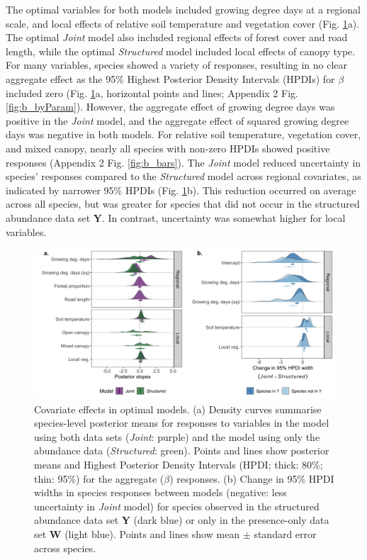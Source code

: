 \documentclass[preprint,review,times,12pt,3p]{elsarticle}
\begin{document}
The optimal variables for both models included growing degree days at a regional scale, and local effects of relative soil temperature and vegetation cover (Fig. \ref{fig:slope_means}a). The optimal \emph{Joint} model also included regional effects of forest cover and road length, while the optimal \emph{Structured} model included local effects of canopy type. For many variables, species showed a variety of responses, resulting in no clear aggregate effect as the 95\% Highest Posterior Density Intervals (HPDIs) for $\beta$ included zero (Fig. \ref{fig:slope_means}a, horizontal points and lines; Appendix 2 Fig. \ref{fig:b_byParam}). However, the aggregate effect of growing degree days was positive in the \emph{Joint} model, and the aggregate effect of squared growing degree days was negative in both models. For relative soil temperature, vegetation cover, and mixed canopy, nearly all species with non-zero HPDIs showed positive responses (Appendix 2 Fig. \ref{fig:b_bars}). The \emph{Joint} model reduced uncertainty in species' responses compared to the \emph{Structured} model across regional covariates, as indicated by narrower 95\% HPDIs (Fig. \ref{fig:slope_means}b). This reduction occurred on average across all species, but was greater for species that did not occur in the structured abundance data set \textbf{Y}. In contrast, uncertainty was somewhat higher for local variables.

\begin{figure}
\centering\includegraphics[width=6in]{../../../ms/1_Ecography/1/figs/slope_means+HDI.png}
\caption{\label{fig:slope_means} Covariate effects in optimal models. (a) Density curves summarise species-level posterior means for responses to variables in the model using both data sets (\emph{Joint}: purple) and the model using only the abundance data (\emph{Structured}: green). Points and lines show posterior means and Highest Posterior Density Intervals (HPDI; thick: 80\%; thin: 95\%) for the aggregate ($\beta$) responses. (b) Change in 95\% HPDI widths in species responses between models (negative: less uncertainty in \emph{Joint} model) for species observed in the structured abundance data set \textbf{Y} (dark blue) or only in the presence-only data set \textbf{W} (light blue). Points and lines show mean $\pm$ standard error across species. }
\end{figure}
\end{document}
